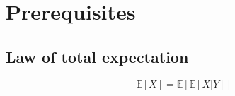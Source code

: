 \section{Prerequisites}

\subsection{Law of total expectation}

\begin{equation}
      \mathbb{E}[X] = \mathbb{E}[\mathbb{E}[X|Y]]
\end{equation}
